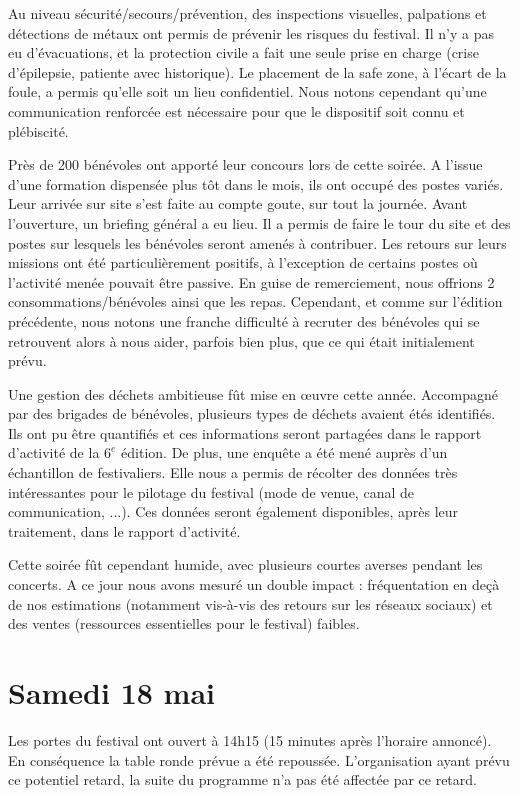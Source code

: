 \documentclass[12pt,a4paper]{report}
\begin{document}
Au niveau sécurité/secours/prévention, des inspections visuelles, palpations et détections de métaux ont permis de prévenir les risques du festival. Il n'y a pas eu d'évacuations, et la protection civile a fait une seule prise en charge (crise d'épilepsie, patiente avec historique). Le placement de la safe zone, à l'écart de la foule, a permis qu'elle soit un lieu confidentiel. Nous notons cependant qu'une communication renforcée est nécessaire pour que le dispositif soit connu et plébiscité. 

Près de 200 bénévoles ont apporté leur concours lors de cette soirée. A l'issue d'une formation dispensée plus tôt dans le mois, ils ont occupé des postes variés. Leur arrivée sur site s'est faite au compte goute, sur tout la journée. Avant l'ouverture, un briefing général a eu lieu. Il a permis de faire le tour du site et des postes sur lesquels les bénévoles seront amenés à contribuer. Les retours sur leurs missions ont été particulièrement positifs, à l'exception de certains postes où l'activité menée pouvait être passive. En guise de remerciement, nous offrions 2 consommations/bénévoles ainsi que les repas. Cependant, et comme sur l'édition précédente, nous notons une franche difficulté à recruter des bénévoles qui se retrouvent alors à nous aider, parfois bien plus, que ce qui était initialement prévu.

Une gestion des déchets ambitieuse fût mise en œuvre cette année. Accompagné par des brigades de bénévoles, plusieurs types de déchets avaient étés identifiés. Ils ont pu être quantifiés et ces informations seront partagées dans le rapport d'activité de la $6^e$ édition. De plus, une enquête a été mené auprès d'un échantillon de festivaliers. Elle nous a permis de récolter des données très intéressantes pour le pilotage du festival (mode de venue, canal de communication, ...). Ces données seront également disponibles, après leur traitement, dans le rapport d'activité.

Cette soirée fût cependant humide, avec plusieurs courtes averses pendant les concerts. A ce jour nous avons mesuré un double impact : fréquentation en deçà de nos estimations (notamment vis-à-vis des retours sur les réseaux sociaux) et des ventes (ressources essentielles pour le festival) faibles.

\section{Samedi 18 mai}

Les portes du festival ont ouvert à 14h15 (15 minutes après l'horaire annoncé). En conséquence la table ronde prévue a été repoussée. L'organisation ayant prévu ce potentiel retard, la suite du programme n'a pas été affectée par ce retard.
\end{document}
